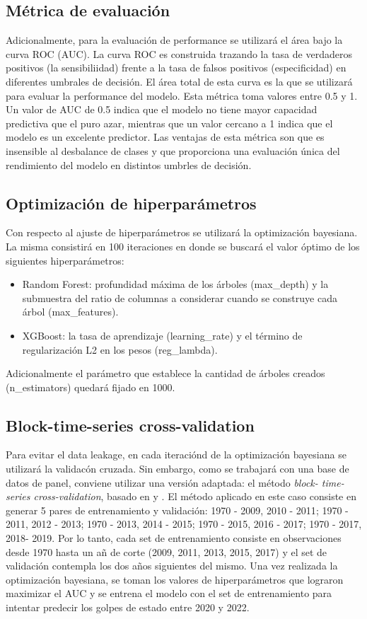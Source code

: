 \documentclass{article}
\begin{document}
\subsection{Métrica de evaluación}
Adicionalmente, para la evaluación de performance se utilizará el área bajo la curva ROC 
(AUC). La curva ROC es construida trazando la tasa de verdaderos positivos (la 
sensibiliidad) frente a la tasa de falsos positivos (especificidad) en diferentes umbrales 
de decisión. El área total de esta curva es la que se utilizará para evaluar la 
performance del modelo. Esta métrica toma valores entre 0.5 y 1. Un valor de AUC de 0.5 
indica que el modelo no tiene mayor capacidad predictiva que el puro azar, mientras que un 
valor cercano a 1 indica que el modelo es un excelente predictor. Las ventajas de 
esta métrica son que es insensible al desbalance de clases y que proporciona una evaluación
única del rendimiento del modelo en distintos umbrles de decisión.

\subsection{Optimización de hiperparámetros}
Con respecto al ajuste de hiperparámetros se utilizará la optimización bayesiana. La misma 
consistirá en 100 iteraciones en donde se buscará el valor óptimo de los siguientes 
hiperparámetros:

\begin{itemize}
  \item Random Forest: profundidad máxima de los árboles (max\_depth) y la 
  submuestra del ratio de columnas a considerar cuando se construye cada árbol 
  (max\_features).
  \item XGBoost: la tasa de aprendizaje (learning\_rate) y el término de 
  regularización L2 en los pesos (reg\_lambda).
\end{itemize}

Adicionalmente el parámetro que establece la cantidad de árboles creados 
(n\_estimators) quedará fijado en 1000.

\subsection{Block-time-series cross-validation}
Para evitar el data leakage, en cada iteraciónd de la optimización bayesiana
se utilizará la validacón cruzada. Sin embargo, como se trabajará con una base
de datos de panel, conviene utilizar una versión adaptada: el método \textit{block-
time-series cross-validation}, basado en \cite{Bur94} y \cite{RAc00}. El método 
aplicado en este caso consiste en generar 5 pares de entrenamiento y validación: 
{1970 - 2009, 2010 - 2011}; {1970 - 2011, 2012 - 2013}; {1970 - 2013, 2014 - 2015}; 
{1970 - 2015, 2016 - 2017}; {1970 - 2017, 2018- 2019}. Por lo tanto, cada set de 
entrenamiento consiste en observaciones desde 1970 hasta un añ de corte (2009, 
2011, 2013, 2015, 2017) y el set de validación contempla los dos años siguientes 
del mismo. Una vez realizada la optimización bayesiana, se toman los valores de 
hiperparámetros que lograron maximizar el AUC y se entrena el modelo con el set de 
entrenamiento para intentar predecir los golpes de estado entre 2020 y 2022. 
\end{document}
